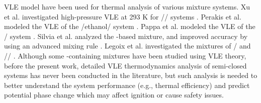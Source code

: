 VLE model have been used for thermal analysis of various mixture systems. Xu et al. investigated high-pressure VLE at 293 K for // systems \cite{xu1992high}. Perakis et al. modeled the VLE of the /ethanol/ system \cite{perakis2006thermodynamic}. Pappa et al. modeled the VLE of the / system \cite{pappa2009thermodynamic}. Silvia et al. analyzed the -based mixture, and improved accuracy by using an advanced mixing rule \cite{lasala2016vle}. Legoix et al. investigated the mixtures of / and // \cite{legoix2017phase}.    
Although some -containing mixtures have been studied using VLE theory, before the present work, detailed VLE thermodynamics analysis of semi-closed  systems has never been conducted in the literature, but such analysis is needed to better understand the  system performance (e.g., thermal efficiency) and predict potential phase change which may affect ignition or cause safety issues.

